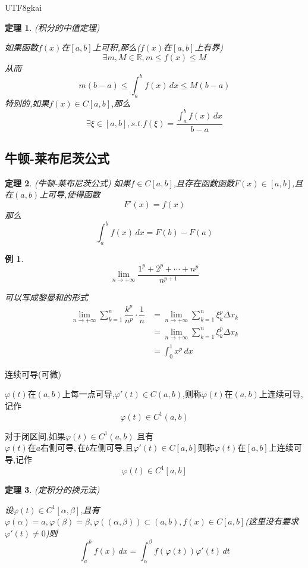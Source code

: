 \documentclass{article}
\newtheorem{theorem}{定理}[subsection]
\newtheorem{example}{例}[subsection]
\newenvironment{identification}{%
\heiti{定义}\kaishu
}{%
}
\newcommand{\RR}{\mathbb{R}}
\begin{document}
\begin{CJK}{UTF8}{gkai}
\begin{theorem}
  (积分的中值定理)

  如果函数$f(x)$在$[a,b]$上可积,那么($f(x)$在$[a,b]$上有界)
  \[\exists m,M \in \RR,  m \leq f(x) \leq M\]
  从而
  \[m(b - a) \leq\int_{a}^{b}f(x)\,dx \leq M (b - a)\]
  特别的,如果$f(x)\in C[a,b]$,那么
  \[\exists\xi \in [a,b],s.t.f(\xi) = \dfrac{\int_{a}^{b}f(x)\, dx}{b - a}\]
\end{theorem}
\subsection{牛顿-莱布尼茨公式}
\begin{theorem}
  (牛顿-莱布尼茨公式)
  如果$f\in C[a,b]$,且存在函数函数$F(x) \in [a,b]$,且在$(a,b)$上可导,使得函数\[F'(x) = f(x)\]
  那么
  \[\int_{a}^{b}f(x)\,dx = F(b) - F(a)\]

\end{theorem}

\begin{example}
  \[\lim_{n\to +\infty} \dfrac{1^p + 2 ^ p +\cdots + n^p}{n^{p + 1}}\]

  可以写成黎曼和的形式
  \[
  \begin{aligned}  
  \lim_{n\to +\infty}\sum_{k = 1}^{n} \dfrac{k^p}{n^p} \cdot \dfrac{1}{n}&=\lim_{n\to +\infty}\sum_{k = 1}^{n} \xi_k^p \Delta x_k\\
  &=\lim_{n\to +\infty}\sum_{k = 1}^{n} \xi_k^p \Delta x_k\\
  &=\int_{0}^{1}x^p\,dx 
  \end{aligned}
  \]
  
\end{example}


\begin{identification}
连续可导(可微)

$\varphi(t)$在$(a,b)$上每一点可导,$\varphi'(t) \in C(a,b)$,则称$\varphi(t)$在$(a,b)$上连续可导,记作
\[\varphi(t) \in C^1 (a,b)\]

对于闭区间,如果$\varphi(t) \in C^1 (a,b)$
且有
$\varphi(t)\text{在}a\text{右侧可导},\text{在}b\text{左侧可导,且} \varphi'(t) \in C[a,b]$则称$\varphi(t)$在$[a,b]$上连续可导,记作
\[\varphi(t) \in C^1 [a,b]\]
\end{identification}

\begin{theorem}
  (定积分的换元法)

  设$\varphi(t) \in C^1[\alpha,\beta]$,且有$\varphi(\alpha) = a , \varphi(\beta) = \beta , \varphi((\alpha,\beta)) \subset (a,b),f(x) \in C[a,b]$(这里没有要求$\varphi'(t) \neq 0$)则
  \[\int_{a}^{b}f(x)\,dx = \int_{\alpha}^{\beta}f(\varphi(t))\varphi'(t)\,dt\]


\end{theorem}
\end{CJK}
\end{document}
